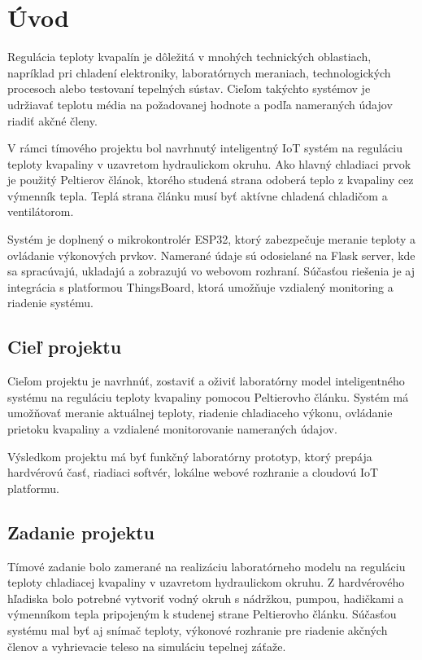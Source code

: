 
\section{Úvod}

Regulácia teploty kvapalín je dôležitá v mnohých technických oblastiach, napríklad 
pri chladení elektroniky, laboratórnych meraniach, technologických procesoch alebo 
testovaní tepelných sústav. Cieľom takýchto systémov je udržiavať teplotu média na 
požadovanej hodnote a podľa nameraných údajov riadiť akčné členy.

V rámci tímového projektu bol navrhnutý inteligentný IoT systém na reguláciu teploty 
kvapaliny v uzavretom hydraulickom okruhu. Ako hlavný chladiaci prvok je použitý 
Peltierov článok, ktorého studená strana odoberá teplo z kvapaliny cez výmenník tepla. 
Teplá strana článku musí byť aktívne chladená chladičom a ventilátorom.

Systém je doplnený o mikrokontrolér ESP32, ktorý zabezpečuje meranie teploty a ovládanie 
výkonových prvkov. Namerané údaje sú odosielané na Flask server, kde sa spracúvajú, 
ukladajú a zobrazujú vo webovom rozhraní. Súčasťou riešenia je aj integrácia s platformou 
ThingsBoard, ktorá umožňuje vzdialený monitoring a riadenie systému.

\subsection{Cieľ projektu}

Cieľom projektu je navrhnúť, zostaviť a oživiť laboratórny model inteligentného systému na 
reguláciu teploty kvapaliny pomocou Peltierovho článku. Systém má umožňovať meranie aktuálnej 
teploty, riadenie chladiaceho výkonu, ovládanie prietoku kvapaliny a vzdialené monitorovanie 
nameraných údajov.

Výsledkom projektu má byť funkčný laboratórny prototyp, ktorý prepája hardvérovú časť, 
riadiaci softvér, lokálne webové rozhranie a cloudovú IoT platformu.

\subsection{Zadanie projektu}

Tímové zadanie bolo zamerané na realizáciu laboratórneho modelu na reguláciu teploty 
chladiacej kvapaliny v uzavretom hydraulickom okruhu. Z hardvérového hľadiska bolo potrebné 
vytvoriť vodný okruh s nádržkou, pumpou, hadičkami a výmenníkom tepla pripojeným 
k studenej strane Peltierovho článku. Súčasťou systému mal byť aj snímač teploty, 
výkonové rozhranie pre riadenie akčných členov a vyhrievacie teleso na simuláciu tepelnej záťaže.

